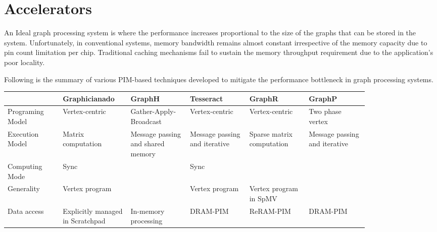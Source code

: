 \section{Accelerators}
An Ideal graph processing system is where the performance increases proportional to the size of the graphs that can be stored in the system. Unfortunately, in conventional systems, memory bandwidth remains almost constant irrespective of the memory capacity due to pin count limitation per chip. Traditional caching mechanisms fail to sustain the memory throughput requirement due to the application's poor locality. 

Following is the summary of various PIM-based techniques developed to mitigate the performance bottleneck in graph processing systems. \par


\begin{table*}[t]
\centering
\begin{tabular}{|p{0.13\linewidth}|p{0.14\linewidth}|p{0.14\linewidth}|p{0.14\linewidth}|p{0.14\linewidth}|p{0.14\linewidth}|}
\hline
& Graphicianado                    & GraphH                            & Tesseract                     & GraphR                    & GraphP                        \\ \hline
Programing Model & Vertex-centric                   & Gather-Apply-Broadcast            & Vertex-centric                & Vertex-centric            & Two phase vertex              \\ \hline
Execution Model  & Matrix computation               & Message passing and shared memory & Message passing and iterative & Sparse matrix computation & Message passing and iterative \\ \hline
Computing Mode   & Sync                             &                                   & Sync                          &                           &                               \\ \hline
Generality       & Vertex program                   &                                   & Vertex program                & Vertex program in SpMV    &                               \\ \hline
Data access      & Explicitly managed in Scratchpad & In-memory processing              & DRAM-PIM                      & ReRAM-PIM                 & DRAM-PIM                      \\ \hline
\end{tabular}
\end{table*}

